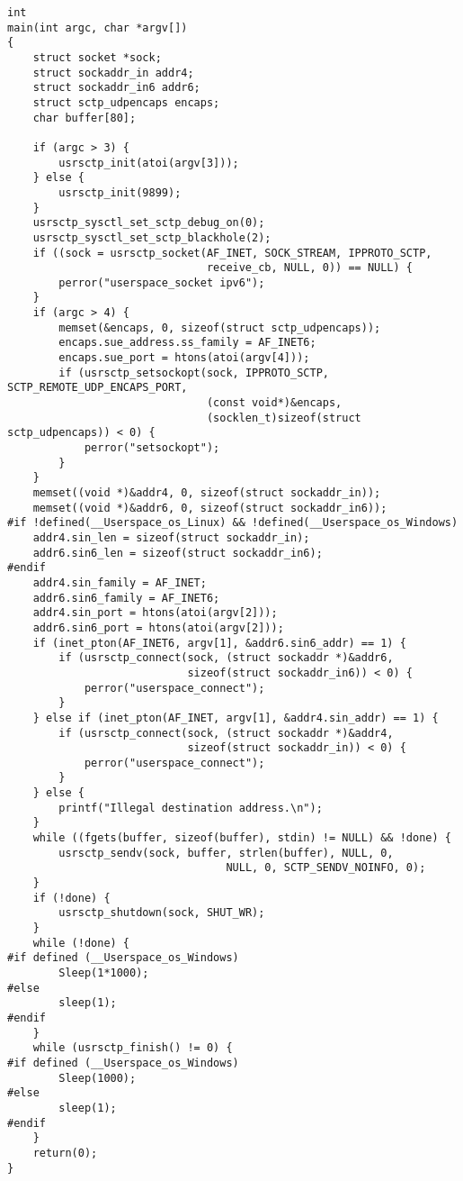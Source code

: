 \documentclass[a4paper]{article}
\begin{document}
\begin{verbatim}
int
main(int argc, char *argv[])
{
    struct socket *sock;
    struct sockaddr_in addr4;
    struct sockaddr_in6 addr6;
    struct sctp_udpencaps encaps;
    char buffer[80];

    if (argc > 3) {
        usrsctp_init(atoi(argv[3]));
    } else {
        usrsctp_init(9899);
    }
    usrsctp_sysctl_set_sctp_debug_on(0);
    usrsctp_sysctl_set_sctp_blackhole(2);
    if ((sock = usrsctp_socket(AF_INET, SOCK_STREAM, IPPROTO_SCTP, 
                               receive_cb, NULL, 0)) == NULL) {
        perror("userspace_socket ipv6");
    }
    if (argc > 4) {
        memset(&encaps, 0, sizeof(struct sctp_udpencaps));
        encaps.sue_address.ss_family = AF_INET6;
        encaps.sue_port = htons(atoi(argv[4]));
        if (usrsctp_setsockopt(sock, IPPROTO_SCTP, SCTP_REMOTE_UDP_ENCAPS_PORT, 
                               (const void*)&encaps, 
                               (socklen_t)sizeof(struct sctp_udpencaps)) < 0) {
            perror("setsockopt");
        }
    }
    memset((void *)&addr4, 0, sizeof(struct sockaddr_in));
    memset((void *)&addr6, 0, sizeof(struct sockaddr_in6));
#if !defined(__Userspace_os_Linux) && !defined(__Userspace_os_Windows)
    addr4.sin_len = sizeof(struct sockaddr_in);
    addr6.sin6_len = sizeof(struct sockaddr_in6);
#endif
    addr4.sin_family = AF_INET;
    addr6.sin6_family = AF_INET6;
    addr4.sin_port = htons(atoi(argv[2]));
    addr6.sin6_port = htons(atoi(argv[2]));
    if (inet_pton(AF_INET6, argv[1], &addr6.sin6_addr) == 1) {
        if (usrsctp_connect(sock, (struct sockaddr *)&addr6, 
                            sizeof(struct sockaddr_in6)) < 0) {
            perror("userspace_connect");
        }
    } else if (inet_pton(AF_INET, argv[1], &addr4.sin_addr) == 1) {
        if (usrsctp_connect(sock, (struct sockaddr *)&addr4, 
                            sizeof(struct sockaddr_in)) < 0) {
            perror("userspace_connect");
        }
    } else {
        printf("Illegal destination address.\n");
    }
    while ((fgets(buffer, sizeof(buffer), stdin) != NULL) && !done) {
        usrsctp_sendv(sock, buffer, strlen(buffer), NULL, 0,
				                  NULL, 0, SCTP_SENDV_NOINFO, 0);
    }
    if (!done) {
        usrsctp_shutdown(sock, SHUT_WR);
    }
    while (!done) {
#if defined (__Userspace_os_Windows)
        Sleep(1*1000);
#else
        sleep(1);
#endif
    }
    while (usrsctp_finish() != 0) {
#if defined (__Userspace_os_Windows)
        Sleep(1000);
#else
        sleep(1);
#endif
    }
    return(0);
}

\end{verbatim}
\end{document}
